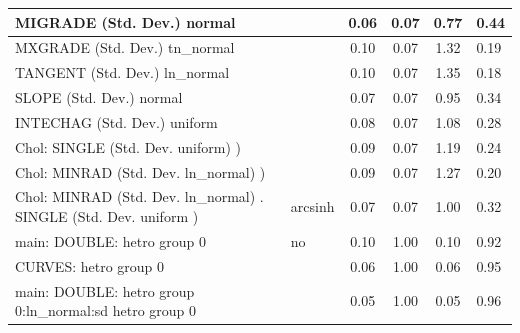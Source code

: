 \begin{table}
\begin{center}
\begin{tabular}{|l|l|c|c|c|l|}
			\hline
			MIGRADE (Std. Dev.) normal &  & 0.06 & 0.07 & 0.77 & 0.44 \\
			\hline
			MXGRADE (Std. Dev.) tn_normal &  & 0.10 & 0.07 & 1.32 & 0.19 \\
			\hline
			TANGENT (Std. Dev.) ln_normal &  & 0.10 & 0.07 & 1.35 & 0.18 \\
			\hline
			SLOPE (Std. Dev.) normal &  & 0.07 & 0.07 & 0.95 & 0.34 \\
			\hline
			INTECHAG (Std. Dev.) uniform &  & 0.08 & 0.07 & 1.08 & 0.28 \\
			\hline
			 Chol: SINGLE (Std. Dev. uniform) ) &  & 0.09 & 0.07 & 1.19 & 0.24 \\
			\hline
			 Chol: MINRAD (Std. Dev. ln_normal) ) &  & 0.09 & 0.07 & 1.27 & 0.20 \\
			\hline
			 Chol: MINRAD (Std. Dev. ln_normal) . SINGLE (Std. Dev.   uniform ) & arcsinh & 0.07 & 0.07 & 1.00 & 0.32 \\
			\hline
			main: DOUBLE: hetro group 0 & no & 0.10 & 1.00 & 0.10 & 0.92 \\
			\hline
			CURVES: hetro group 0 &  & 0.06 & 1.00 & 0.06 & 0.95 \\
			\hline
			main: DOUBLE: hetro group 0:ln_normal:sd  hetro group 0 &  & 0.05 & 1.00 & 0.05 & 0.96 \\
			\hline
		\end{tabular}
	\end{center}
\end{table}